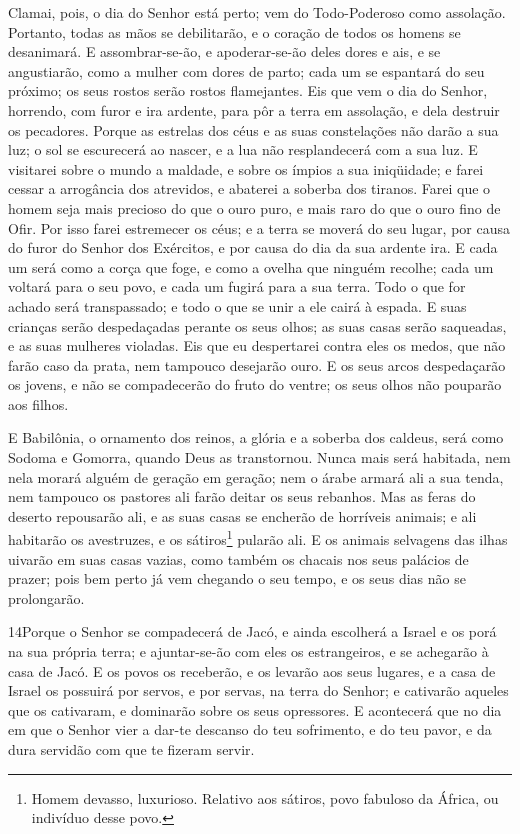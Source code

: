 Clamai, pois, o dia do Senhor está perto; vem do Todo-Poderoso
como assolação. Portanto, todas as mãos se debilitarão, e o
coração de todos os homens se desanimará. E assombrar-se-ão, e
apoderar-se-ão deles dores e ais, e se angustiarão, como a mulher
com dores de parto; cada um se espantará do seu próximo; os seus
rostos serão rostos flamejantes. Eis que vem o dia do Senhor,
horrendo, com furor e ira ardente, para pôr a terra em assolação, e
dela destruir os pecadores. Porque as estrelas dos céus e as
suas constelações não darão a sua luz; o sol se escurecerá ao
nascer, e a lua não resplandecerá com a sua luz. E visitarei
sobre o mundo a maldade, e sobre os ímpios a sua iniqüidade; e farei
cessar a arrogância dos atrevidos, e abaterei a soberba dos tiranos.
Farei que o homem seja mais precioso do que o ouro puro, e
mais raro do que o ouro fino de Ofir. Por isso farei
estremecer os céus; e a terra se moverá do seu lugar, por causa do
furor do Senhor dos Exércitos, e por causa do dia da sua ardente
ira. E cada um será como a corça que foge, e como a ovelha
que ninguém recolhe; cada um voltará para o seu povo, e cada um
fugirá para a sua terra. Todo o que for achado será
transpassado; e todo o que se unir a ele cairá à espada. E
suas crianças serão despedaçadas perante os seus olhos; as suas
casas serão saqueadas, e as suas mulheres violadas. Eis que
eu despertarei contra eles os medos, que não farão caso da prata,
nem tampouco desejarão ouro. E os seus arcos despedaçarão os
jovens, e não se compadecerão do fruto do ventre; os seus olhos não
pouparão aos filhos.

E Babilônia, o ornamento dos reinos, a glória e a soberba dos
caldeus, será como Sodoma e Gomorra, quando Deus as transtornou.
Nunca mais será habitada, nem nela morará alguém de geração
em geração; nem o árabe armará ali a sua tenda, nem tampouco os
pastores ali farão deitar os seus rebanhos. Mas as feras do
deserto repousarão ali, e as suas casas se encherão de horríveis
animais; e ali habitarão os avestruzes, e os sátiros\footnote{Homem
devasso, luxurioso. Relativo aos sátiros, povo fabuloso da África,
ou indivíduo desse povo.} pularão ali. E os animais selvagens
das ilhas uivarão em suas casas vazias, como também os chacais nos
seus palácios de prazer; pois bem perto já vem chegando o seu tempo,
e os seus dias não se prolongarão.

\medskip

\lettrine{14}{}Porque o Senhor se compadecerá de Jacó, e ainda
escolherá a Israel e os porá na sua própria terra; e ajuntar-se-ão
com eles os estrangeiros, e se achegarão à casa de Jacó. E os
povos os receberão, e os levarão aos seus lugares, e a casa de
Israel os possuirá por servos, e por servas, na terra do Senhor; e
cativarão aqueles que os cativaram, e dominarão sobre os seus
opressores. E acontecerá que no dia em que o Senhor vier a
dar-te descanso do teu sofrimento, e do teu pavor, e da dura
servidão com que te fizeram servir.

